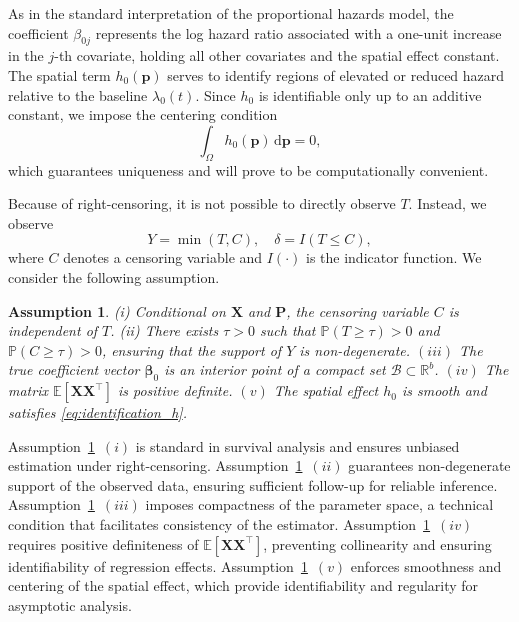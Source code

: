 \documentclass[11pt]{article}
\newtheorem{assumption}{Assumption}
\begin{document}
As in the standard interpretation of the proportional hazards model, the coefficient $\beta_{0j}$ represents the log hazard ratio associated with a one-unit increase in the $j$-th covariate, holding all other covariates and the spatial effect constant. The spatial term $h_0(\bm{p})$ serves to identify regions of elevated or reduced hazard relative to the baseline $\lambda_0(t)$. Since $h_0$ is identifiable only up to an additive constant, we impose the centering condition
\begin{equation}\label{eq:identification_h}
\int_{\Omega} h_0(\bm{p})\,\mathrm{d}\bm{p} = 0,
\end{equation}
which guarantees uniqueness and will prove to be computationally convenient.

Because of right-censoring, it is not possible to directly observe $T$. Instead, we observe
\[
Y = \min(T, C), 
\quad \delta = I(T \le C),
\]
where $C$ denotes a censoring variable and $I(\cdot)$ is the indicator function. We consider the following assumption.

\begin{assumption}\label{assumption:identifiability}
	(i) Conditional on $\bm{X}$ and $\bm{P}$, the censoring variable $C$ is independent of $T$.
	(ii) There exists $\tau > 0$ such that $\mathbb{P}(T \ge \tau) > 0$ and $\mathbb{P}(C \ge \tau) > 0$, ensuring that the support of $Y$ is non-degenerate. $(iii)$ The true coefficient vector \(\bm\beta_0\) is an interior point of a compact set \(\mathcal B \subset \mathbb{R}^b\). $(iv)$ The matrix \(\mathbb E[\bm X\bm X^\top]\) is positive definite. $(v)$ The spatial effect $h_0$ is smooth and satisfies \eqref{eq:identification_h}. %
\end{assumption}
Assumption~\ref{assumption:identifiability}~$(i)$ is standard in survival analysis and ensures unbiased estimation under right-censoring. 
Assumption~\ref{assumption:identifiability}~$(ii)$ guarantees non-degenerate support of the observed data, ensuring sufficient follow-up for reliable inference. 
Assumption~\ref{assumption:identifiability}~$(iii)$ imposes compactness of the parameter space, a technical condition that facilitates consistency of the estimator. 
Assumption~\ref{assumption:identifiability}~$(iv)$ requires positive definiteness of $\mathbb{E}[\bm X \bm X^\top]$, preventing collinearity and ensuring identifiability of regression effects. 
Assumption~\ref{assumption:identifiability}~$(v)$ enforces smoothness and centering of the spatial effect, which provide identifiability and regularity for asymptotic analysis. 
\end{document}
